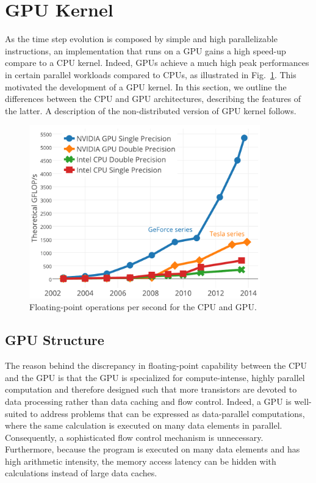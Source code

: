 \section{GPU Kernel}
As the time step evolution is composed by simple and high parallelizable instructions, an implementation that runs on a GPU gains a high speed-up compare to a CPU kernel. Indeed, GPUs achieve a much high peak performances in certain parallel workloads compared to CPUs, as illustrated in Fig.~\ref{fig:CPU-GPU-computational-power}. This motivated the development of a GPU kernel. In this section, we outline the differences between the CPU and GPU architectures, describing the features of the latter. A description of the non-distributed version of GPU kernel follows.
\begin{figure}
   \centering
   \includegraphics[width=10cm]{Figs/GPU-vs-CPU.pdf}
   \caption{Floating-point operations per second for the CPU and GPU.} \label{fig:CPU-GPU-computational-power}
\end{figure}

\subsection{GPU Structure}
The reason behind the discrepancy in floating-point capability between the CPU and the GPU is that the GPU is specialized for compute-intense, highly parallel computation and therefore designed such that more transistors are devoted to data processing rather than data caching and flow control. Indeed, a GPU is well-suited to address problems that can be expressed as data-parallel computations, where the same calculation is executed on many data elements in parallel. Consequently,  a sophisticated flow control mechanism is unnecessary. Furthermore, because the program is executed on many data elements and has high arithmetic intensity, the memory access latency can be hidden with calculations instead of large data caches.

